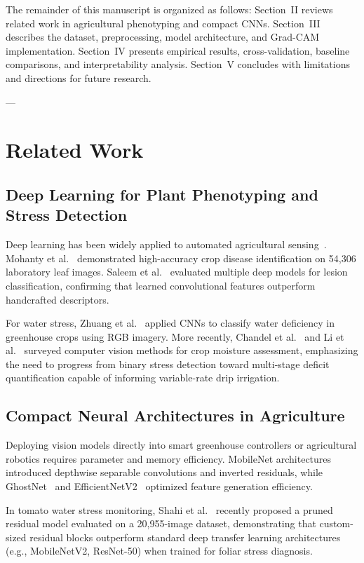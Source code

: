 \documentclass[conference]{IEEEtran}
\begin{document}
The remainder of this manuscript is organized as follows: Section~II reviews related work in agricultural phenotyping and compact CNNs. Section~III describes the dataset, preprocessing, model architecture, and Grad-CAM implementation. Section~IV presents empirical results, cross-validation, baseline comparisons, and interpretability analysis. Section~V concludes with limitations and directions for future research.

---

\section{Related Work}

\subsection{Deep Learning for Plant Phenotyping and Stress Detection}
Deep learning has been widely applied to automated agricultural sensing~\cite{kamilaris2018deep}. Mohanty et al.~\cite{mohanty2016using} demonstrated high-accuracy crop disease identification on 54,306 laboratory leaf images. Saleem et al.~\cite{saleem2019plant} evaluated multiple deep models for lesion classification, confirming that learned convolutional features outperform handcrafted descriptors.

For water stress, Zhuang et al.~\cite{zhuang2018identification} applied CNNs to classify water deficiency in greenhouse crops using RGB imagery. More recently, Chandel et al.~\cite{chandel2021deep} and Li et al.~\cite{li2022high} surveyed computer vision methods for crop moisture assessment, emphasizing the need to progress from binary stress detection toward multi-stage deficit quantification capable of informing variable-rate drip irrigation.

\subsection{Compact Neural Architectures in Agriculture}
Deploying vision models directly into smart greenhouse controllers or agricultural robotics requires parameter and memory efficiency. MobileNet architectures~\cite{howard2017mobilenets, sandler2018mobilenetv2} introduced depthwise separable convolutions and inverted residuals, while GhostNet~\cite{han2020ghostnet} and EfficientNetV2~\cite{tan2021efficientnetv2} optimized feature generation efficiency. 

In tomato water stress monitoring, Shahi et al.~\cite{shahi2025deep} recently proposed a pruned residual model evaluated on a 20,955-image dataset, demonstrating that custom-sized residual blocks outperform standard deep transfer learning architectures (e.g., MobileNetV2, ResNet-50) when trained for foliar stress diagnosis.
\end{document}

